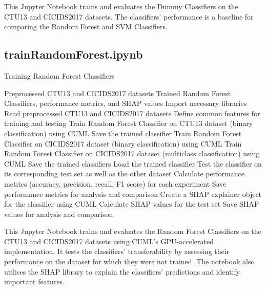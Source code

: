 This Jupyter Notebook trains and evaluates the Dummy Classifiers on the CTU13 and CICIDS2017 datasets. The classifiers' performance is a baseline for comparing the Random Forest and SVM Classifiers.

\subsection{trainRandomForest.ipynb}\label{subsec:trainRandomForest.ipynb}

\begin{algorithm}[H]
\caption{Training Random Forest Classifiers}\label{alg:trainRandomForest}
\begin{algorithmic}[1]
\Require%
Preprocessed CTU13 and CICIDS2017 datasets
\Ensure%
Trained Random Forest Classifiers, performance metrics, and SHAP values
\State%
Import necessary libraries
\State%
Read preprocessed CTU13 and CICIDS2017 datasets
\State%
Define common features for training and testing
        \State%
        Train Random Forest Classifier on CTU13 dataset (binary classification) using CUML
        \State%
        Save the trained classifier
        \State%
        Train Random Forest Classifier on CICIDS2017 dataset (binary classification) using CUML
        \State%
        Train Random Forest Classifier on CICIDS2017 dataset (multiclass classification) using CUML
        \State%
        Save the trained classifiers
    \EndIf%
\EndFor%
    \State%
    Load the trained classifier
    \State%
    Test the classifier on its corresponding test set as well as the other dataset
    \State%
    Calculate performance metrics (accuracy, precision, recall, F1 score) for each experiment
    \State%
    Save performance metrics for analysis and comparison
    \State%
    Create a SHAP explainer object for the classifier using CUML
    \State%
    Calculate SHAP values for the test set
    \State%
    Save SHAP values for analysis and comparison
\EndFor%
\end{algorithmic}
\end{algorithm}

This Jupyter Notebook trains and evaluates the Random Forest Classifiers on the CTU13 and CICIDS2017 datasets using CUML's GPU-accelerated implementation. It tests the classifiers' transferability by assessing their performance on the dataset for which they were not trained. The notebook also utilises the SHAP library to explain the classifiers' predictions and identify important features.

